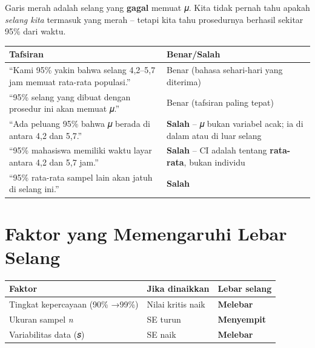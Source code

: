 \documentclass[
  indonesian,
  letterpaper,
]{book}
\newcounter{none} %
\begin{document}
Garis merah adalah selang yang \textbf{gagal} memuat 𝜇. Kita tidak
pernah tahu apakah \emph{selang kita} termasuk yang merah -- tetapi kita
tahu prosedurnya berhasil sekitar 95\% dari waktu.

{\def\LTcaptype{none} %
\begin{longtable}[]{@{}
  >{\raggedright\arraybackslash}p{}
  >{\raggedright\arraybackslash}p{}@{}}
\toprule\noalign{}
\begin{minipage}[b]{\linewidth}\raggedright
Tafsiran
\end{minipage} & \begin{minipage}[b]{\linewidth}\raggedright
Benar/Salah
\end{minipage} \\
\midrule\noalign{}
\endhead
\bottomrule\noalign{}
\endlastfoot
``Kami 95\% yakin bahwa selang 4,2--5,7 jam memuat rata-rata populasi.''
& Benar (bahasa sehari-hari yang diterima) \\
``95\% selang yang dibuat dengan prosedur ini akan memuat 𝜇.'' & Benar
(tafsiran paling tepat) \\
``Ada peluang 95\% bahwa 𝜇 berada di antara 4,2 dan 5,7.'' &
\textbf{Salah} -- 𝜇 bukan variabel acak; ia di dalam atau di luar
selang \\
``95\% mahasiswa memiliki waktu layar antara 4,2 dan 5,7 jam.'' &
\textbf{Salah} -- CI adalah tentang \textbf{rata-rata}, bukan
individu \\
``95\% rata-rata sampel lain akan jatuh di selang ini.'' &
\textbf{Salah} \\
\end{longtable}
}

\section{Faktor yang Memengaruhi Lebar
Selang}\label{faktor-yang-memengaruhi-lebar-selang}

{\def\LTcaptype{none} %
\begin{longtable}[]{@{}lll@{}}
\toprule\noalign{}
Faktor & Jika dinaikkan & Lebar selang \\
\midrule\noalign{}
\endhead
\bottomrule\noalign{}
\endlastfoot
Tingkat kepercayaan (90\% →99\%) & Nilai kritis naik &
\textbf{Melebar} \\
Ukuran sampel \emph{n} & SE turun & \textbf{Menyempit} \\
Variabilitas data (𝑠) & SE naik & \textbf{Melebar} \\
\end{longtable}
}
\end{document}

